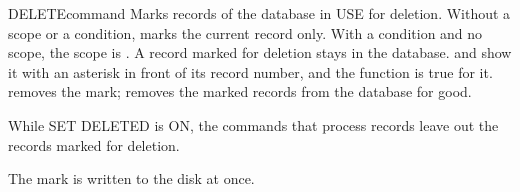 \begin{XbaseEntry}{DELETE}{command}
Marks records of the database in USE for deletion.
\Syntax
{}
\Defaults
Without a scope or a condition,  marks the current record only.
With a  condition and no scope, the scope is .
\Usage
A record marked for deletion stays in the database.   and
 show it with an asterisk in front of its record number, and the
function  is true for it.   removes the mark;
 removes the marked records from the database for good.

While SET DELETED is ON, the commands that process records leave out the
records marked for deletion.

The mark is written to the disk at once.
\Examples
{}
\end{XbaseEntry}

